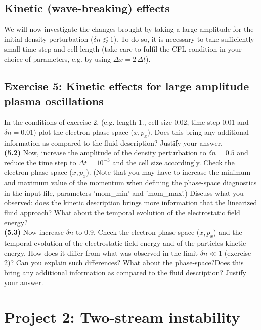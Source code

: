 \documentclass[11pt,a4paper]{article}
\begin{document}
\subsection*{Kinetic (wave-breaking) effects}

We will now investigate the changes brought by taking a large amplitude for the initial density perturbation ($\delta n \lesssim 1$). To do so, it is necessary to take sufficiently small time-step and cell-length (take care to fulfil the CFL condition in your choice of parameters, e.g. by using $\Delta x = 2\,\Delta t $).

\subsection*{Exercise 5: Kinetic effects for large amplitude plasma oscillations}

  In the conditions of exercise 2, (e.g. length 1., cell size 0.02, time step 0.01 and $\delta n = 0.01$) plot the electron phase-space ($x,p_x$). Does this bring any additional information as compared to the fluid description? Justify your answer.\\
{\bf (5.2)} Now, increase the amplitude of the density perturbation to $\delta n = 0.5$ and reduce the time step to $\Delta t =  10^{-3}$ and the cell size accordingly. Check  the electron phase-space ($x,p_x$). (Note that you may have to increase the minimum and maximum value of the momentum when defining the phase-space diagnostics in the input file, parameters 'mom\_min' and 'mom\_max'.) Discuss what you observed: does the kinetic description brings more information that the linearized fluid approach? What about the temporal evolution of the electrostatic field energy?\\
{\bf (5.3)} Now increase $\delta n$ to 0.9. Check the  electron phase-space ($x,p_x$) and the temporal evolution of the electrostatic field energy and of the particles kinetic energy. How does it differ from what was observed in the limit $\delta n \ll 1$ (exercise 2)? Can you explain such differences? What about the phase-space?Does this bring any additional information as compared to the fluid description? Justify your answer.\\


\newpage
\section*{Project 2: Two-stream instability}\label{proj2}
\end{document}
